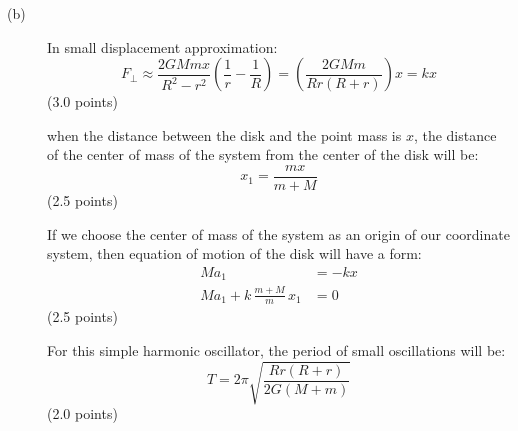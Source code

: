 \begin{description}
\item[(b)] In small displacement approximation:
  \[
    F_\perp \approx \frac{2GMmx}{R^2 - r^2}
      \left(\frac{1}{r} - \frac{1}{R}\right)
      = \left(\frac{2GMm}{Rr(R + r)}\right)x = kx
  \]
  \hfill(3.0 points)

  when the distance between the disk and the point mass is $x$, the distance
  of the center of mass of the system from the center of the disk will be:
  \[
    x_1 = \frac{mx}{m + M}
  \]
  \hfill(2.5 points)

  If we choose the center of mass of the system as an origin of our coordinate
  system, then equation of motion of the disk will have a form:
  \begin{align*}
    Ma_1 &= -kx \\
    Ma_1 + k\,\frac{m + M}{m}\,x_1 &= 0
  \end{align*}
  \hfill(2.5 points)

  For this simple harmonic oscillator, the period of small oscillations will
  be:
  \[
    T = 2\pi\sqrt{\frac{Rr(R + r)}{2G(M + m)}}
  \]
  \hfill(2.0 points)
\end{description}
